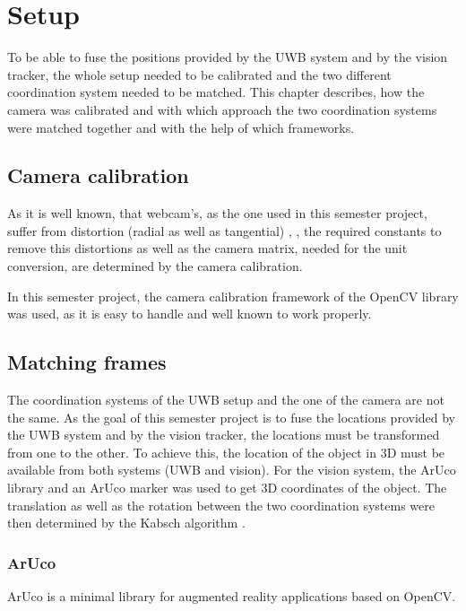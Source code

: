 
\setcounter{chapter}{2}

\chapter{Setup}
To be able to fuse the positions provided by the UWB system and by the vision tracker, the whole setup needed to be calibrated and the two different coordination system needed to be matched. This chapter describes, how the camera was calibrated and with which approach the two coordination systems were matched together and with the help of which frameworks. 

\section{Camera calibration}
As it is well known, that webcam's, as the one used in this semester project, suffer from distortion (radial as well as tangential) \cite{Szeliski:2010:CVA:1941882}, \cite{opencv_library}, the required constants to remove this distortions as well as the camera matrix, needed for the unit conversion, are determined by the camera calibration.

In this semester project, the camera calibration framework of the OpenCV library \cite{opencv_library} was used, as it is easy to handle and well known to work properly.

\section{Matching frames}
The coordination systems of the UWB setup and the one of the camera are not the same. As the goal of this semester project is to fuse the locations provided by the UWB system and by the vision tracker, the locations must be transformed from one to the other. To achieve this, the location of the object in 3D must be available from both systems (UWB and vision). For the vision system, the ArUco \cite{Aruco2014} library and an ArUco marker was used to get 3D coordinates of the object. The translation as well as the rotation between the two coordination systems were then determined by the Kabsch algorithm \cite{Kabsch:a12999}.

\subsection{ArUco}
ArUco \cite{Aruco2014} is a minimal library for augmented reality applications based on OpenCV.

